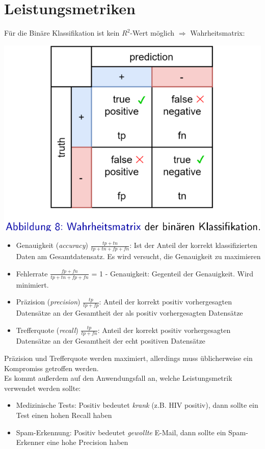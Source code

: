 \documentclass{report}
\begin{document}
  \section{Leistungsmetriken}	
  Für die Binäre Klassifikation ist kein $R^2$-Wert möglich $\Rightarrow$ Wahrheitsmatrix:	
  \begin{center}	
    \includegraphics[scale=.25]{ml03_7}	
  \end{center}	
  \vspace*{-1.25em}	
  \begin{itemize}	
    \item Genauigkeit (\textit{accuracy}) $\frac{tp + tn}{tp + tn + fp + fn}$: Ist der Anteil der korrekt klassifizierten Daten am Gesamtdatensatz.	
    Es wird versucht, die Genauigkeit zu maximieren	
    \item Fehlerrate $\frac{fp + fn}{tp + tn + fp + fn}$ = 1 - Genauigkeit: Gegenteil der Genauigkeit. Wird minimiert.	
    \item Präzision (\textit{precision}) $\frac{tp}{tp + fp}$: Anteil der korrekt positiv vorhergesagten Datensätze an der Gesamtheit der als positiv vorhergesagten Datensätze	
    \item Trefferquote (\textit{recall}) $\frac{tp}{tp + fn}$: Anteil der korrekt positiv vorhergesagten Datensätze an der Gesamtheit der echt positiven Datensätze	
  \end{itemize}	
  Präzision und Trefferquote werden maximiert, allerdings muss üblicherweise ein Kompromiss getroffen werden.\\	
  Es kommt außerdem auf den Anwendungsfall an, welche Leistungsmetrik verwendet werden sollte:\\	
  \vspace*{-1.25em}	
  \begin{itemize}	
    \item Medizinische Tests: Positiv bedeutet \textit{krank} (z.B. HIV positiv), dann sollte ein Test einen hohen Recall haben	
    \item Spam-Erkennung: Positiv bedeutet \textit{gewollte} E-Mail, dann sollte ein Spam-Erkenner eine hohe Precision haben	
  \end{itemize}	
  
\end{document}
